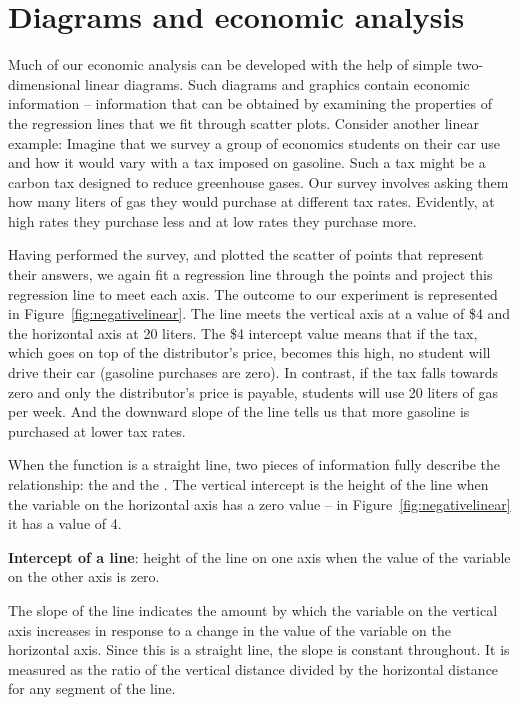 \section{Diagrams and economic analysis}\label{sec:ch2sec4}

Much of our economic analysis can be developed with the help of simple two-dimensional linear diagrams. Such diagrams and graphics contain economic information -- information that can be obtained by examining the properties of the regression lines that we fit through scatter plots. Consider another linear example: Imagine that we survey a group of economics students on their car use and how it would vary with a tax imposed on gasoline. Such a tax might be a carbon tax designed to reduce greenhouse gases. Our survey involves asking them how many liters of gas they would purchase at different tax rates. Evidently, at high rates they purchase less and at low rates they purchase more. 

Having performed the survey, and plotted the scatter of points that represent their answers, we again fit a regression line through the points and project this regression line to meet each axis. The outcome to our experiment is represented in Figure~\ref{fig:negativelinear}. The line meets the vertical axis at a value of \$4 and the horizontal axis at 20 liters. The \$4 intercept value means that if the tax, which goes on top of the distributor's price, becomes this high, no student will drive their car (gasoline purchases are zero). In contrast, if the tax falls towards zero and only the distributor's price is payable, students will use 20 liters of gas per week. And the downward slope of the line tells us that more gasoline is purchased at lower tax rates.

When the function is a straight line, two pieces of information fully describe the relationship: the  and the . The vertical intercept is the height of the line when the variable on the horizontal axis has a zero value -- in Figure~\ref{fig:negativelinear} it has a value of 4. 

\begin{DefBox}
\textbf{Intercept of a line}: height of the line on one axis when the value of the variable on the other axis is zero.
\end{DefBox}



The slope of the line indicates the amount by which the variable on the vertical axis increases in response to a change in the value of the variable on the horizontal axis. Since this is a straight line, the slope is constant throughout. It is measured as the ratio of the vertical distance divided by the horizontal distance for any segment of the line. 


